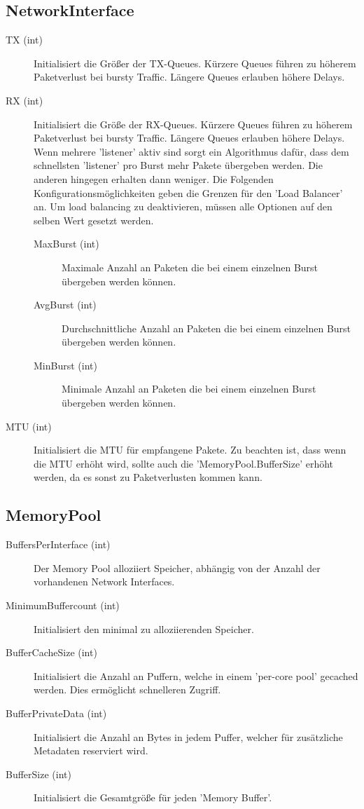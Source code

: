 \documentclass[a4paper, 11pt, ngerman, fleqn]{article}
\begin{document}
\subsection{NetworkInterface}
	
\begin{description}
	\item [TX (int)] Initialisiert die Größer der TX-Queues. Kürzere Queues führen zu höherem Paketverlust bei bursty Traffic. Längere Queues erlauben höhere Delays.
	\item [RX (int)] Initialisiert die Größe der RX-Queues. Kürzere Queues führen zu höherem Paketverlust bei bursty Traffic. Längere Queues erlauben höhere Delays. Wenn mehrere 'listener' aktiv sind sorgt ein Algorithmus dafür, dass dem schnellsten 'listener' pro Burst mehr Pakete übergeben werden. Die anderen hingegen erhalten dann weniger. Die Folgenden Konfigurationsmöglichkeiten geben die Grenzen für den 'Load Balancer' an. Um load balancing zu deaktivieren, müssen alle Optionen auf den selben Wert gesetzt werden.
	\begin{description}
		\item [MaxBurst (int)] Maximale Anzahl an Paketen die bei einem einzelnen Burst übergeben werden können. 
		\item [AvgBurst (int)] Durchschnittliche Anzahl an Paketen die bei einem einzelnen Burst übergeben werden können. 
		\item [MinBurst (int)] Minimale Anzahl an Paketen die bei einem einzelnen Burst übergeben werden können.
	\end{description}
	\item [MTU (int)] Initialisiert die MTU für empfangene Pakete. Zu beachten ist, dass wenn die MTU erhöht wird, sollte auch die 'MemoryPool.BufferSize' erhöht werden, da es sonst zu Paketverlusten kommen kann. 
\end{description}	

\subsection{MemoryPool}

\begin{description}
	\item [BuffersPerInterface (int)] Der Memory Pool alloziiert Speicher, abhängig von der Anzahl der vorhandenen Network Interfaces.
	\item [MinimumBuffercount (int)] Initialisiert den minimal zu alloziierenden Speicher.
	\item [BufferCacheSize (int)] Initialisiert die Anzahl an Puffern, welche in einem 'per-core pool' gecached werden. Dies ermöglicht schnelleren Zugriff.
	\item [BufferPrivateData (int)] Initialisiert die Anzahl an Bytes in jedem Puffer, welcher für zusätzliche Metadaten reserviert wird.
	\item [BufferSize (int)] Initialisiert die Gesamtgröße für jeden 'Memory Buffer'.
\end{description}
\end{document}
